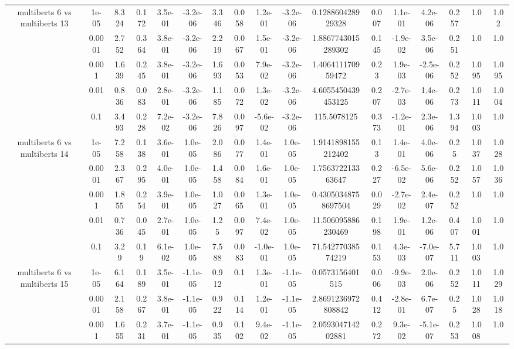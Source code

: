 \begin{tabular}{|c|c|c|c|c|c|c|c|c|c|c|c|c|c|c|c|c|}
\hline
\multirow{5}{*}{multiberts 6 vs multiberts 13} & 1e-05 & 8.324 & 0.172 & 3.5e-01 & -3.2e-06 & 3.346 & 0.058 & 1.2e-01 & -3.2e-06 & 0.128860428929328 & 0.007 & 1.1e-01 & 4.2e-06 & 0.257 & 1.0 & 1.02 \\
 & 0.0001 & 2.752 & 0.364 & 3.8e-01 & -3.2e-06 & 2.219 & 0.067 & 1.5e-01 & -3.2e-06 & 1.8867743015289302 & 0.145 & -1.9e-02 & 3.5e-06 & 0.251 & 1.0 & 1.0 \\
 & 0.001 & 1.639 & 0.245 & 3.8e-01 & -3.2e-06 & 1.693 & 0.053 & 7.9e-02 & -3.2e-06 & 1.406411170959472 & 0.23 & 1.9e-03 & -2.5e-06 & 0.252 & 1.095 & 1.095 \\
 & 0.01 & 0.836 & 0.083 & 2.8e-01 & -3.2e-06 & 1.185 & 0.072 & 1.3e-02 & -3.2e-06 & 4.6055450439453125 & 0.207 & -2.7e-03 & 1.4e-06 & 0.273 & 1.011 & 1.004 \\
 & 0.1 & 3.493 & 0.228 & 7.2e-02 & -3.2e-06 & 7.826 & 0.097 & -5.6e-02 & -3.2e-06 & 115.5078125 & 0.373 & -1.2e-01 & 2.3e-06 & 1.394 & 1.003 & 1.0 \\
\hline
\multirow{5}{*}{multiberts 6 vs multiberts 14} & 1e-05 & 7.258 & 0.138 & 3.6e-01 & 1.0e-05 & 2.086 & 0.077 & 1.4e-01 & 1.0e-05 & 1.9141898155212402 & 0.13 & 1.4e-01 & 4.0e-06 & 0.25 & 1.037 & 1.028 \\
 & 0.0001 & 2.367 & 0.295 & 4.0e-01 & 1.0e-05 & 1.458 & 0.084 & 1.6e-01 & 1.0e-05 & 1.756372213363647 & 0.227 & -6.5e-02 & 5.6e-06 & 0.252 & 1.057 & 1.036 \\
 & 0.001 & 1.855 & 0.254 & 3.9e-01 & 1.0e-05 & 1.027 & 0.065 & 1.3e-01 & 1.0e-05 & 0.43050348758697504 & 0.029 & -2.7e-02 & 2.4e-07 & 0.252 & 1.0 & 1.0 \\
 & 0.01 & 0.736 & 0.045 & 2.7e-01 & 1.0e-05 & 1.25 & 0.097 & 7.4e-02 & 1.0e-05 & 11.506095886230469 & 0.198 & 1.9e-01 & 1.2e-06 & 0.407 & 1.001 & 1.0 \\
 & 0.1 & 3.29 & 0.19 & 6.1e-02 & 1.0e-05 & 7.588 & 0.083 & -1.0e-01 & 1.0e-05 & 71.54277038574219 & 0.153 & 4.3e-03 & -7.0e-07 & 5.711 & 1.003 & 1.0 \\
\hline
\multirow{5}{*}{multiberts 6 vs multiberts 15} & 1e-05 & 6.164 & 0.189 & 3.5e-01 & -1.1e-05 & 0.912 & 0.1 & 1.3e-01 & -1.1e-05 & 0.0573156401515 & 0.006 & -9.9e-03 & 2.0e-06 & 0.252 & 1.011 & 1.029 \\
 & 0.0001 & 2.158 & 0.267 & 3.8e-01 & -1.1e-05 & 0.922 & 0.114 & 1.2e-01 & -1.1e-05 & 2.8691236972808842 & 0.412 & -2.8e-01 & 6.7e-07 & 0.25 & 1.028 & 1.018 \\
 & 0.001 & 1.655 & 0.231 & 3.7e-01 & -1.1e-05 & 0.935 & 0.102 & 9.4e-02 & -1.1e-05 & 2.059304714202881 & 0.272 & 9.3e-02 & -5.1e-07 & 0.253 & 1.008 & 1.0 \\

\end{tabular}
